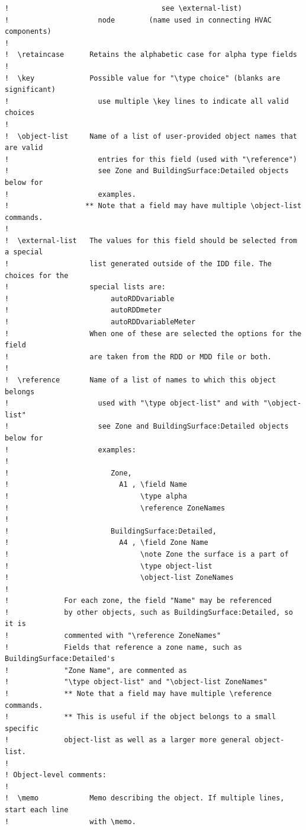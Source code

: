 \begin{lstlisting}
!                                    see \external-list)
!                     node        (name used in connecting HVAC components)
!
!  \retaincase      Retains the alphabetic case for alpha type fields
!
!  \key             Possible value for "\type choice" (blanks are significant)
!                     use multiple \key lines to indicate all valid choices
!
!  \object-list     Name of a list of user-provided object names that are valid
!                     entries for this field (used with "\reference")
!                     see Zone and BuildingSurface:Detailed objects below for
!                     examples.
!                  ** Note that a field may have multiple \object-list commands.
!
!  \external-list   The values for this field should be selected from a special
!                   list generated outside of the IDD file. The choices for the
!                   special lists are:
!                        autoRDDvariable
!                        autoRDDmeter
!                        autoRDDvariableMeter
!                   When one of these are selected the options for the field
!                   are taken from the RDD or MDD file or both.
!
!  \reference       Name of a list of names to which this object belongs
!                     used with "\type object-list" and with "\object-list"
!                     see Zone and BuildingSurface:Detailed objects below for
!                     examples:
!
!                        Zone,
!                          A1 , \field Name
!                               \type alpha
!                               \reference ZoneNames
!
!                        BuildingSurface:Detailed,
!                          A4 , \field Zone Name
!                               \note Zone the surface is a part of
!                               \type object-list
!                               \object-list ZoneNames
!
!             For each zone, the field "Name" may be referenced
!             by other objects, such as BuildingSurface:Detailed, so it is
!             commented with "\reference ZoneNames"
!             Fields that reference a zone name, such as BuildingSurface:Detailed's
!             "Zone Name", are commented as
!             "\type object-list" and "\object-list ZoneNames"
!             ** Note that a field may have multiple \reference commands.
!             ** This is useful if the object belongs to a small specific
!             object-list as well as a larger more general object-list.
!
! Object-level comments:
!
!  \memo            Memo describing the object. If multiple lines, start each line
!                   with \memo.

\end{lstlisting}
